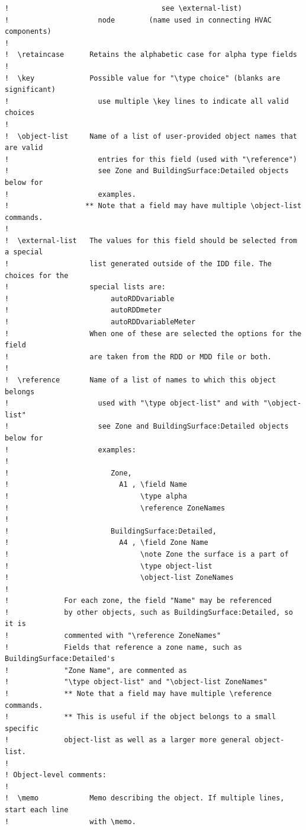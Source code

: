 \begin{lstlisting}
!                                    see \external-list)
!                     node        (name used in connecting HVAC components)
!
!  \retaincase      Retains the alphabetic case for alpha type fields
!
!  \key             Possible value for "\type choice" (blanks are significant)
!                     use multiple \key lines to indicate all valid choices
!
!  \object-list     Name of a list of user-provided object names that are valid
!                     entries for this field (used with "\reference")
!                     see Zone and BuildingSurface:Detailed objects below for
!                     examples.
!                  ** Note that a field may have multiple \object-list commands.
!
!  \external-list   The values for this field should be selected from a special
!                   list generated outside of the IDD file. The choices for the
!                   special lists are:
!                        autoRDDvariable
!                        autoRDDmeter
!                        autoRDDvariableMeter
!                   When one of these are selected the options for the field
!                   are taken from the RDD or MDD file or both.
!
!  \reference       Name of a list of names to which this object belongs
!                     used with "\type object-list" and with "\object-list"
!                     see Zone and BuildingSurface:Detailed objects below for
!                     examples:
!
!                        Zone,
!                          A1 , \field Name
!                               \type alpha
!                               \reference ZoneNames
!
!                        BuildingSurface:Detailed,
!                          A4 , \field Zone Name
!                               \note Zone the surface is a part of
!                               \type object-list
!                               \object-list ZoneNames
!
!             For each zone, the field "Name" may be referenced
!             by other objects, such as BuildingSurface:Detailed, so it is
!             commented with "\reference ZoneNames"
!             Fields that reference a zone name, such as BuildingSurface:Detailed's
!             "Zone Name", are commented as
!             "\type object-list" and "\object-list ZoneNames"
!             ** Note that a field may have multiple \reference commands.
!             ** This is useful if the object belongs to a small specific
!             object-list as well as a larger more general object-list.
!
! Object-level comments:
!
!  \memo            Memo describing the object. If multiple lines, start each line
!                   with \memo.

\end{lstlisting}
